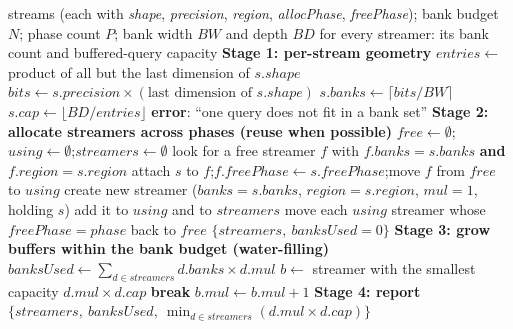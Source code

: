 \documentclass{cernatsnote}
\begin{document}
\begin{algorithm}[H]
\caption{DFX streamer buffer allocation}
\label{alg:magic_streamer}
\begin{algorithmic}[1]
\Require streams (each with \emph{shape}, \emph{precision}, \emph{region}, \emph{allocPhase}, \emph{freePhase}); bank budget $N$; phase count $P$; bank width $BW$ and depth $BD$
\Ensure for every streamer: its bank count and buffered-query capacity
\Statex
\State \textbf{Stage 1: per-stream geometry}
    \State $entries \gets$ product of all but the last dimension of $s.shape$ 
    \State $bits \gets s.precision \times (\text{last dimension of } s.shape)$
    \State $s.banks \gets \lceil bits / BW \rceil$ 
    \State $s.cap \gets \lfloor BD / entries \rfloor$ 
        \State \textbf{error}: ``one query does not fit in a bank set''
    \EndIf
\EndFor
\Statex
\State \textbf{Stage 2: allocate streamers across phases (reuse when possible)}
\State $free \gets \emptyset$;\quad $using \gets \emptyset$;\quad $streamers \gets \emptyset$
        \State look for a free streamer $f$ with $f.banks = s.banks$ \textbf{and} $f.region = s.region$
            \State attach $s$ to $f$;\quad $f.freePhase \gets s.freePhase$;\quad move $f$ from $free$ to $using$
        \Else
            \State create new streamer ($banks = s.banks$, $region = s.region$, $mul = 1$, holding $s$)
            \State add it to $using$ and to $streamers$
        \EndIf
    \EndFor
    \State move each $using$ streamer whose $freePhase = phase$ back to $free$ 
\EndFor
{}
    \State \Return $\{streamers,\ banksUsed = 0\}$
\EndIf
\Statex
\State \textbf{Stage 3: grow buffers within the bank budget (water-filling)}
    \State $banksUsed \gets \sum_{d \in streamers} d.banks \times d.mul$
    \State $b \gets$ streamer with the smallest capacity $d.mul \times d.cap$ 
        \State \textbf{break} 
    \EndIf
    \State $b.mul \gets b.mul + 1$ 
\EndWhile
\Statex
\State \textbf{Stage 4: report}
\State \Return $\{streamers,\ banksUsed,\ \min_{d \in streamers}(d.mul \times d.cap)\}$
\end{algorithmic}
\end{algorithm}
\end{document}
